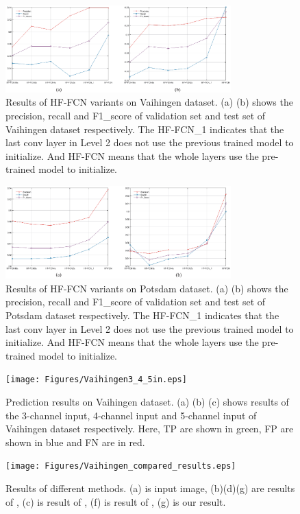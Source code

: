 \begin{figure}
\centering
\includegraphics[width=8.7cm]{Figures/vaihingen_variants.eps}
\caption{Results of HF-FCN variants on Vaihingen dataset. (a) (b) shows the precision, recall and F1\_score of validation set and test set of Vaihingen dataset respectively. The HF-FCN\_1 indicates that the last conv layer in Level 2 does not use the previous trained model to initialize. And HF-FCN means that the whole layers use the pre-trained model to initialize.}
\label{12}
\end{figure}

\begin{figure}
\centering
\includegraphics[width=8.7cm]{Figures/Potsdam_variants.eps}
\caption{Results of HF-FCN variants on Potsdam dataset. (a) (b) shows the precision, recall and F1\_score of validation set and test set of Potsdam dataset respectively. The HF-FCN\_1 indicates that the last conv layer in Level 2 does not use the previous trained model to initialize. And HF-FCN means that the whole layers use the pre-trained model to initialize.}
\label{13}
\end{figure}

\begin{figure}
\centering
\texttt{[image: Figures/Vaihingen3\_4\_5in.eps]}
\caption{Prediction results on Vaihingen dataset. (a) (b) (c) shows results of the 3-channel input, 4-channel input and 5-channel input of Vaihingen dataset respectively. Here, TP are shown in green, FP are shown in blue and FN are in red.}
\label{14}
\end{figure}

\begin{figure}
\centering
\texttt{[image: Figures/Vaihingen\_compared\_results.eps]}
\caption{Results of different methods. (a) is input image, (b)(d)(g) are results of \cite{IEEEexample:audebert2017deep}, (c) is result of \cite{IEEEexample:marmanis2016semantic}, (f) is result of \cite{IEEEexample:unknown}, (g) is our result.}
\label{15}
\end{figure}

